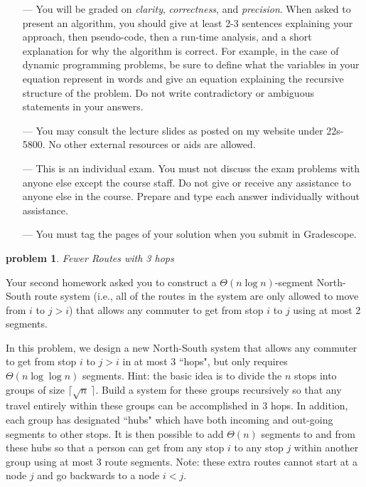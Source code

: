 \documentclass[11pt]{article}
\newtheorem{problem}{\sc\color{cit}problem}
\begin{document}
\begin{enumerate}
    \item[---] You will be
      graded on  {\em clarity},  {\em correctness}, and  {\em precision}.  When asked to present an algorithm, you should give at least 2-3 sentences explaining your approach, then pseudo-code,  then a run-time analysis, and a short explanation for why the algorithm is correct.  For example, in the case of dynamic programming problems, be sure to define what the variables in your equation represent in words and  give an equation explaining the recursive structure of the problem.  Do not write contradictory or ambiguous statements in your answers.

    \item[---] You may consult the lecture slides as posted on my website under 22s-5800. No other external resources or aids are allowed.

    \item[---] This is an individual exam.  You must not discuss the exam problems with anyone else except the course staff. Do not give or receive any assistance to anyone else in the course.  Prepare and type each answer individually without assistance.   

    \item[---] You must tag the pages of your solution when you submit in Gradescope.

    \end{enumerate}
    

    \renewcommand{\labelenumi}{{\bf (\alph{enumi})}}
    
    
\begin{problem} Fewer Routes with 3 hops\end{problem}

Your second homework asked you to construct a $\Theta(n\log n)$-segment North-South route system (i.e., all of the routes in the system are only allowed to move from $i$ to $j>i$) that allows any commuter to get from stop $i$ to $j$ using at most 2 segments.  

In this problem, we design a new North-South system
that allows any commuter to get from stop $i$ to $j>i$ in at most 3 ``hops", but only requires $\Theta(n\log\log n)$ segments.   Hint: the basic idea is to divide the $n$ stops into groups of size $\lceil {\sqrt{n}\ } \rceil$.  Build a system for these groups recursively so that any travel entirely within these groups can be accomplished in 3 hops.   In addition, each group has  designated ``hubs" which have both incoming and out-going segments to other stops.   It is then possible to add $\Theta(n)$ segments to and from these hubs so that a person can get from any stop $i$ to any stop $j$ within another group using at most 3 route segments. Note: these extra routes cannot start at a node $j$ and go backwards to a node $i<j$.
\end{document}
